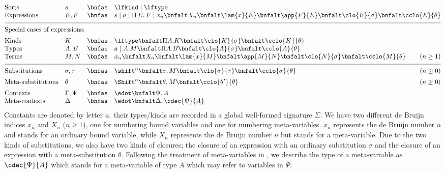 \documentclass[copyright,creativecommons]{eptcs}
\begin{document}
\[ 
\begin{array}{@{}llcl@{}r@{}}
\mbox{Sorts} & s & \bnfas & \lfkind \mid \lftype \\
\mbox{Expressions} & E,F & \bnfas & \multicolumn 2 {l@{}} {
s \mid a \mid \fun E F
 \mid x_n \bnfalt X_n \bnfalt \lam{x}{E}
\bnfalt \app{F}{E} \bnfalt \clo{E}{\sigma} \bnfalt \cclo{E}{\theta} 
} \\[0.5em]
\hline\\[-0.75em]
\multicolumn{4}{@{}l@{}}{\mbox{Special cases of expressions:}} \\[0.5em]
\mbox{Kinds} & K & \bnfas & \lftype \bnfalt \Pi A.K \bnfalt
\clo{K}{\sigma} \bnfalt \cclo{K}{\theta} \\
\mbox{Types} & A,B & \bnfas & a \mid A\;M \bnfalt \Pi A.B
\bnfalt \clo{A}{\sigma}  \bnfalt \cclo{A}{\theta} \\ 
\mbox{Terms} & M,N & \bnfas &  x_n \bnfalt X_n \bnfalt \lam{x}{M}
\bnfalt \app{M}{N} \bnfalt \clo{N}{\sigma} \bnfalt \cclo{M}{\theta} 
& (n \geq 1)
\\[0.5em]
\hline \\[-0.75em]
\mbox{Substitutions} & \sigma, \tau & \bnfas & \shift^n \bnfalt 
  \sigma, M  \bnfalt \clo{\sigma}{\tau}  \bnfalt \cclo{\sigma}{\theta}
& (n \geq 0)
\\[0.5em]
\mbox{Meta-substitutions} 
& \theta & \bnfas & \Shift^n \bnfalt
\theta,M \bnfalt \cclo{\theta'}{\theta}
& (n \geq 0)
\\[0.5em]
\mbox{Contexts} & \Gamma,\Psi & \bnfas & \edot \bnfalt \Psi, A  \\
\mbox{Meta-contexts} & \Delta & \bnfas &  \edot \bnfalt \Delta,
\cdec{\Psi}{A} 

\end{array} 
\]
Constants are denoted by letter $a$, their types/kinds are recorded in
a global well-formed signature $\Sigma$.
We have two different de Bruijn indices $x_n$ and $X_n$ ($n \geq 1$), 
one for numbering bound variables and one for numbering meta-variables.  
$x_n$ represents the
de Bruijn number $n$ and stands for an ordinary bound variable, while
$X_n$ represents the de Bruijn number $n$ but stands for a
meta-variable. Due to the two kinds of substitutions, we also have two
kinds of closures; the closure of an expression with an ordinary substitution
$\sigma$ and the closure of an expression with a meta-substitution
$\theta$. Following the treatment of meta-variables in
\cite{Nanevski:ICML05}, we describe the type of a meta-variable as
$\cdec{\Psi}{A}$ which stands for a meta-variable of type $A$ which
may refer to variables in $\Psi$. 
\end{document}

